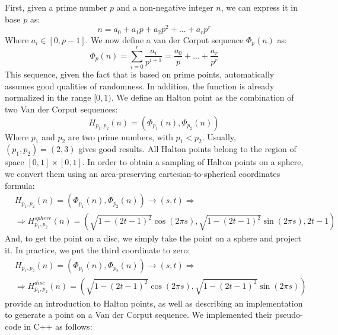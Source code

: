 First, given a prime number $p$ and a non-negative integer $n$, we can express it in base $p$ as:
$$
n = a_0 + {a_1} p + a_2 p^2 + ... + a_r p^r
$$  
Where $a_i \in [0, p - 1]$. We now define a van der Corput sequence $\Phi_p(n)$ as:
$$
\Phi_p(n) = \sum_{i = 0}^r \frac{a_i}{p^{i+1}} = \frac{a_0}{p} + ... + \frac{a_r}{p^r}
$$
This sequence, given the fact that is based on prime points, automatically assumes good qualities of randomness. In addition, the function is already normalized in the range $[0,1)$. We define an Halton point as the combination of two Van der Corput sequences:
$$
H_{p_1,p_2}(n) = (\Phi_{p_1}(n), \Phi_{p_2}(n))
$$ 
Where $p_1$ and $p_2$ are two prime numbers, with $p_1 < p_2$. Usually, $(p_1,p_2) = (2,3)$ gives good results. All Halton points belong to the region of space $[0,1]\times[0,1]$. In order to obtain a sampling of Halton points on a sphere, we convert them using an area-preserving cartesian-to-spherical coordinates formula:
\begin{equation*}
\begin{split}
&H_{p_1,p_2}(n) = (\Phi_{p_1}(n), \Phi_{p_2}(n)) \rightarrow (s,t) \Rightarrow \\
&\Rightarrow H^{sphere}_{p_1,p_2}(n) = (\sqrt{1 - (2t - 1) ^2} \cos(2\pi s),\sqrt{1 - (2t - 1) ^2} \sin(2\pi s), 2t-1) 
\end{split}
\end{equation*}
And, to get the point on a disc, we simply take the point on a sphere and project it. In practice, we put the third coordinate to zero:
\begin{equation*}
\begin{split}
&H_{p_1,p_2}(n) = (\Phi_{p_1}(n), \Phi_{p_2}(n)) \rightarrow (s,t) \Rightarrow\\
& \Rightarrow H^{disc}_{p_1,p_2}(n) = (\sqrt{1 - (2t - 1) ^2} \cos(2\pi s),\sqrt{1 - (2t - 1) ^2} \sin(2\pi s)) 
\end{split}
\end{equation*}
\cite{journals/jgtools/WongLH97} provide an introduction to Halton points, as well as describing an implementation to generate a point on a Van der Corput sequence. We implemented their pseudo-code in C++ as follows:

